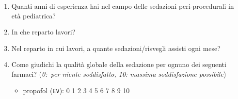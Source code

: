 \begin{tcolorbox}[breakable,title=Questionario sulla sedazione per infermieri/e,colback=xkcdCloudyBlue!30,colframe=xkcdCloudyBlue!30,coltitle=black,colbacktitle=xkcdCloudyBlue!70,fonttitle=\sffamily\mdseries\scshape,halign title=flush center, arc=3mm, boxrule=0pt]

\begin{enumerate}
           \item Quanti anni di esperienza hai nel campo delle sedazioni peri-procedurali in età pediatrica? 
           
           \item In che reparto lavori? 
           
           \item Nel reparto in cui lavori, a quante sedazioni/risvegli assisti ogni mese?
           
           \item Come giudichi la qualità globale della sedazione per ognuno dei seguenti farmaci? (\emph{0:~per niente soddisfatto, 10: massima soddisfazione possibile})
           \begin{itemize}
               \item propofol (\texttt{EV}): \colorbox{xkcdCloudyBlue!70}{0} \colorbox{xkcdCloudyBlue!70}{1} \colorbox{xkcdCloudyBlue!70}{2} \colorbox{xkcdCloudyBlue!70}{3} \colorbox{xkcdCloudyBlue!70}{4} \colorbox{xkcdCloudyBlue!70}{5} \colorbox{xkcdCloudyBlue!70}{6} \colorbox{xkcdCloudyBlue!70}{7} \colorbox{xkcdCloudyBlue!70}{8} \colorbox{xkcdCloudyBlue!70}{9} \colorbox{xkcdCloudyBlue!70}{10} 
            

\end{itemize}
\end{enumerate}
\end{tcolorbox}
